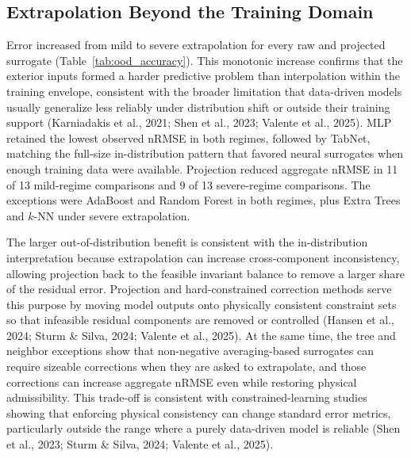 \documentclass[a4paper,fleqn]{cas-sc}
\begin{document}
\subsection{Extrapolation Beyond the Training Domain}

Error increased from mild to severe extrapolation for every raw and projected surrogate (Table~\ref{tab:ood_accuracy}). This monotonic increase confirms that the exterior inputs formed a harder predictive problem than interpolation within the training envelope, consistent with the broader limitation that data-driven models usually generalize less reliably under distribution shift or outside their training support (Karniadakis et al., 2021; Shen et al., 2023; Valente et al., 2025). MLP retained the lowest observed nRMSE in both regimes, followed by TabNet, matching the full-size in-distribution pattern that favored neural surrogates when enough training data were available. Projection reduced aggregate nRMSE in 11 of 13 mild-regime comparisons and 9 of 13 severe-regime comparisons. The exceptions were AdaBoost and Random Forest in both regimes, plus Extra Trees and $k$-NN under severe extrapolation.

The larger out-of-distribution benefit is consistent with the in-distribution interpretation because extrapolation can increase cross-component inconsistency, allowing projection back to the feasible invariant balance to remove a larger share of the residual error. Projection and hard-constrained correction methods serve this purpose by moving model outputs onto physically consistent constraint sets so that infeasible residual components are removed or controlled (Hansen et al., 2024; Sturm \& Silva, 2024; Valente et al., 2025). At the same time, the tree and neighbor exceptions show that non-negative averaging-based surrogates can require sizeable corrections when they are asked to extrapolate, and those corrections can increase aggregate nRMSE even while restoring physical admissibility. This trade-off is consistent with constrained-learning studies showing that enforcing physical consistency can change standard error metrics, particularly outside the range where a purely data-driven model is reliable (Shen et al., 2023; Sturm \& Silva, 2024; Valente et al., 2025).
\end{document}
